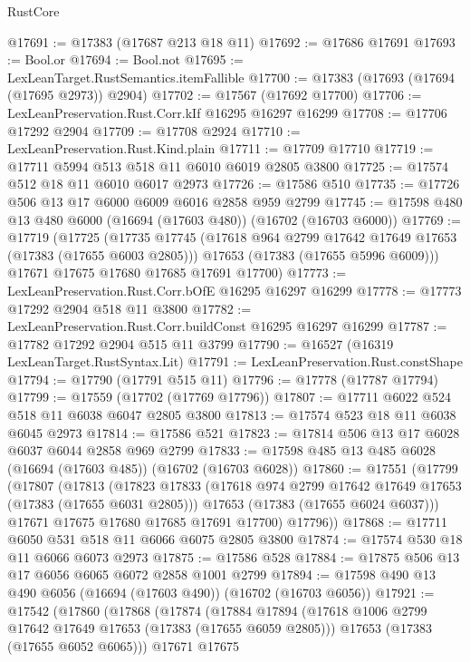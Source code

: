 \begin{lexlean}{RustCore}
\begin{coremodule}
@17691 := @17383 (@17687 @213 @18 @11)
@17692 := @17686 @17691
@17693 := Bool.or
@17694 := Bool.not
@17695 := LexLeanTarget.RustSemantics.itemFallible
@17700 := @17383 (@17693 (@17694 (@17695 @2973)) @2904)
@17702 := @17567 (@17692 @17700)
@17706 := LexLeanPreservation.Rust.Corr.kIf @16295 @16297 @16299
@17708 := @17706 @17292 @2904
@17709 := @17708 @2924
@17710 := LexLeanPreservation.Rust.Kind.plain
@17711 := @17709 @17710
@17719 := @17711 @5994 @513 @518 @11 @6010 @6019 @2805 @3800
@17725 := @17574 @512 @18 @11 @6010 @6017 @2973
@17726 := @17586 @510
@17735 := @17726 @506 @13 @17 @6000 @6009 @6016 @2858 @959 @2799
@17745 := @17598 @480 @13 @480 @6000 (@16694 (@17603 @480)) (@16702 (@16703 @6000))
@17769 := @17719
    (@17725
      (@17735
        @17745
        (@17618 @964 @2799 @17642 @17649 @17653 (@17383 (@17655 @6003 @2805)))
        @17653
        (@17383 (@17655 @5996 @6009)))
      @17671
      @17675
      @17680
      @17685
      @17691
      @17700)
@17773 := LexLeanPreservation.Rust.Corr.bOfE @16295 @16297 @16299
@17778 := @17773 @17292 @2904 @518 @11 @3800
@17782 := LexLeanPreservation.Rust.Corr.buildConst @16295 @16297 @16299
@17787 := @17782 @17292 @2904 @515 @11 @3799
@17790 := @16527 (@16319 LexLeanTarget.RustSyntax.Lit)
@17791 := LexLeanPreservation.Rust.constShape
@17794 := @17790 (@17791 @515 @11)
@17796 := @17778 (@17787 @17794)
@17799 := @17559 (@17702 (@17769 @17796))
@17807 := @17711 @6022 @524 @518 @11 @6038 @6047 @2805 @3800
@17813 := @17574 @523 @18 @11 @6038 @6045 @2973
@17814 := @17586 @521
@17823 := @17814 @506 @13 @17 @6028 @6037 @6044 @2858 @969 @2799
@17833 := @17598 @485 @13 @485 @6028 (@16694 (@17603 @485)) (@16702 (@16703 @6028))
@17860 := @17551
    (@17799
      (@17807
        (@17813
          (@17823
            @17833
            (@17618 @974 @2799 @17642 @17649 @17653 (@17383 (@17655 @6031 @2805)))
            @17653
            (@17383 (@17655 @6024 @6037)))
          @17671
          @17675
          @17680
          @17685
          @17691
          @17700)
        @17796))
@17868 := @17711 @6050 @531 @518 @11 @6066 @6075 @2805 @3800
@17874 := @17574 @530 @18 @11 @6066 @6073 @2973
@17875 := @17586 @528
@17884 := @17875 @506 @13 @17 @6056 @6065 @6072 @2858 @1001 @2799
@17894 := @17598 @490 @13 @490 @6056 (@16694 (@17603 @490)) (@16702 (@16703 @6056))
@17921 := @17542
    (@17860
      (@17868
        (@17874
          (@17884
            @17894
            (@17618 @1006 @2799 @17642 @17649 @17653 (@17383 (@17655 @6059 @2805)))
            @17653
            (@17383 (@17655 @6052 @6065)))
          @17671
          @17675

\end{coremodule}
\end{lexlean}
